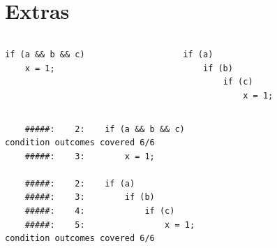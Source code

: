 \documentclass[xcolor = {dvipsnames, table}]{beamer}
\begin{document}
\section{Extras}

\begin{frame}[fragile]
    \begin{columns}
        \begin{column}{0.5\textwidth}
            \centering
            \begin{lstlisting}
if (a && b && c)
    x = 1;
            \end{lstlisting}
        \end{column}

        \begin{column}{0.5\textwidth}
            \centering
            \begin{lstlisting}
if (a)
    if (b)
        if (c)
            x = 1;
            \end{lstlisting}
        \end{column}
    \end{columns}

    \centering
    \pause
    \begin{lstlisting}
    #####:    2:    if (a && b && c)
condition outcomes covered 6/6
    #####:    3:        x = 1;

    #####:    2:    if (a)
    #####:    3:        if (b)
    #####:    4:            if (c)
    #####:    5:                x = 1;
condition outcomes covered 6/6
    \end{lstlisting}
\end{frame}
\end{document}
